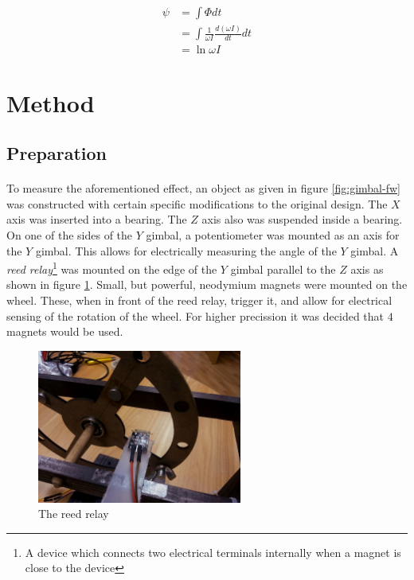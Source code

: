 \documentclass[a4paper]{article}
\begin{document}
\begin{align*}
  \psi &= \int \Phi dt \\
  &= \int \frac{1}{\omega I} \frac{d(\omega I)}{dt} dt \\
  &= \ln \omega I
\end{align*}

\section{Method}

\subsection{Preparation}

\paragraph*{}
To measure the aforementioned effect, an object as given in figure
\ref{fig:gimbal-fw} was constructed with certain specific modifications to the
original design. The $X$ axis was inserted into a bearing. The $Z$ axis also
was suspended inside a bearing.
On one of the sides of the $Y$ gimbal, a potentiometer was mounted as an axis
for the $Y$ gimbal. This allows for electrically measuring the angle of the $Y$
gimbal. A \textit{reed relay}\footnote{A device which connects two electrical
terminals internally when a magnet is close to the device} was mounted on the
edge of the $Y$ gimbal parallel to the $Z$ axis as shown in figure
\ref{fig:reed}. Small, but powerful, neodymium
magnets were mounted on the wheel. These, when in front of the reed relay,
trigger it, and allow for electrical sensing of the rotation of the wheel.
For higher precission it was decided that $4$ magnets would be used. 

\begin{figure}[ht]
  \centering
  \includegraphics[width=0.6\textwidth]{img/reed}
  \caption{The reed relay}
  \label{fig:reed}
\end{figure}
\end{document}

